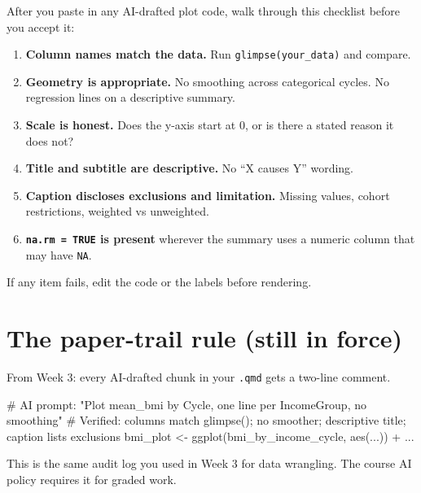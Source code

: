 \documentclass[
  letterpaper,
  DIV=11,
  numbers=noendperiod,
  oneside]{scrreprt}
\newenvironment{Shaded}{\begin{snugshade}}{\end{snugshade}}
\newcommand{\CommentTok}[1]{\textcolor[rgb]{0.37,0.37,0.37}{#1}}
\newcommand{\FunctionTok}[1]{\textcolor[rgb]{0.28,0.35,0.67}{#1}}
\newcommand{\NormalTok}[1]{\textcolor[rgb]{0.00,0.23,0.31}{#1}}
\newcommand{\OtherTok}[1]{\textcolor[rgb]{0.00,0.23,0.31}{#1}}
\newcommand{\SpecialCharTok}[1]{\textcolor[rgb]{0.37,0.37,0.37}{#1}}
\providecommand{\tightlist}{%
  \setlength{\itemsep}{0pt}\setlength{\parskip}{0pt}}
\begin{document}
After you paste in any AI-drafted plot code, walk through this checklist
before you accept it:

\begin{enumerate}
\def\labelenumi{\arabic{enumi}.}
\tightlist
\item
  \textbf{Column names match the data.} Run \texttt{glimpse(your\_data)}
  and compare.
\item
  \textbf{Geometry is appropriate.} No smoothing across categorical
  cycles. No regression lines on a descriptive summary.
\item
  \textbf{Scale is honest.} Does the y-axis start at 0, or is there a
  stated reason it does not?
\item
  \textbf{Title and subtitle are descriptive.} No ``X causes Y''
  wording.
\item
  \textbf{Caption discloses exclusions and limitation.} Missing values,
  cohort restrictions, weighted vs unweighted.
\item
  \textbf{\texttt{na.rm\ =\ TRUE} is present} wherever the summary uses
  a numeric column that may have \texttt{NA}.
\end{enumerate}

If any item fails, edit the code or the labels before rendering.

\section*{The paper-trail rule (still in
force)}\label{the-paper-trail-rule-still-in-force}


From Week 3: every AI-drafted chunk in your \texttt{.qmd} gets a
two-line comment.

\begin{Shaded}
\begin{Highlighting}[numbers=left,,]
\CommentTok{\# AI prompt: "Plot mean\_bmi by Cycle, one line per IncomeGroup, no smoothing"}
\CommentTok{\# Verified: columns match glimpse(); no smoother; descriptive title; caption lists exclusions}
\NormalTok{bmi\_plot }\OtherTok{\textless{}{-}} \FunctionTok{ggplot}\NormalTok{(bmi\_by\_income\_cycle, }\FunctionTok{aes}\NormalTok{(...)) }\SpecialCharTok{+}\NormalTok{ ...}
\end{Highlighting}
\end{Shaded}

This is the same audit log you used in Week 3 for data wrangling. The
course AI policy requires it for graded work.
\end{document}
